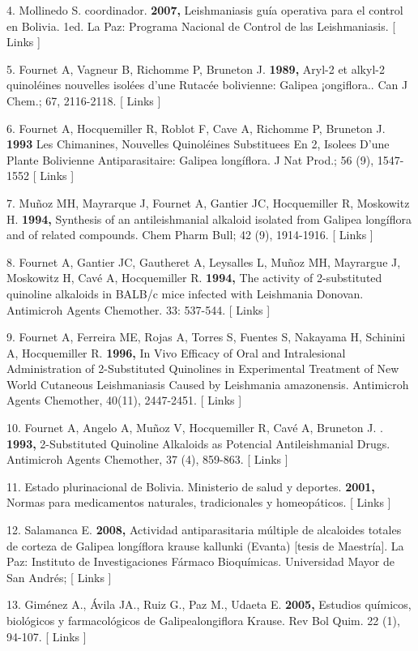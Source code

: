 \documentclass{article}
\begin{document}
4. Mollinedo S. coordinador. \textbf{2007, }
Leishmaniasis guía operativa para el control en Bolivia. 1ed. La Paz: Programa
Nacional de Control de las Leishmaniasis. [ Links ]

5. Fournet A, Vagneur B, Richomme P, Bruneton J. \textbf{1989, }
Aryl-2 et alkyl-2 quinoléines nouvelles isolées d'une Rutacée bolivienne:
Galipea ¡ongiflora.. Can J Chem.; 67, 2116-2118. [ Links ]

6. Fournet A, Hocquemiller R, Roblot F, Cave A, Richomme P, Bruneton J.
\textbf{1993 }
Les Chimanines, Nouvelles Quinoléines Substituees En 2, Isolees D'une Plante
Bolivienne Antiparasitaire: Galipea longíflora. J Nat Prod.; 56 (9), 1547-1552 [
Links ]

7. Muñoz MH, Mayrarque J, Fournet A, Gantier JC, Hocquemiller R, Moskowitz H.
\textbf{1994, }
Synthesis of an antileishmanial alkaloid isolated from Galipea longíflora and of
related compounds. Chem Pharm Bull; 42 (9), 1914-1916. [ Links ]

8. Fournet A, Gantier JC, Gautheret A, Leysalles L, Muñoz MH, Mayrargue J,
Moskowitz H, Cavé A, Hocquemiller R. \textbf{1994, }
The activity of 2-substituted quinoline alkaloids in BALB/c mice infected with
Leishmania Donovan. Antimicroh Agents Chemother. 33: 537-544. [ Links ]

9. Fournet A, Ferreira ME, Rojas A, Torres S, Fuentes S, Nakayama H, Schinini A,
Hocquemiller R. \textbf{1996, }
In Vivo Efficacy of Oral and Intralesional Administration of 2-Substituted
Quinolines in Experimental Treatment of New World Cutaneous Leishmaniasis Caused
by Leishmania amazonensis. Antimicroh Agents Chemother, 40(11), 2447-2451. [
Links ]

10. Fournet A, Angelo A, Muñoz V, Hocquemiller R, Cavé A, Bruneton J. .
\textbf{1993, }
2-Substituted Quinoline Alkaloids as Potencial Antileishmanial Drugs. Antimicroh
Agents Chemother, 37 (4), 859-863. [ Links ]

11. Estado plurinacional de Bolivia. Ministerio de salud y deportes.
\textbf{2001, }
Normas para medicamentos naturales, tradicionales y homeopáticos. [ Links ]

12. Salamanca E. \textbf{2008, }
Actividad antiparasitaria múltiple de alcaloides totales de corteza de Galipea
longíflora krause kallunki (Evanta) [tesis de Maestría]. La Paz: Instituto de
Investigaciones Fármaco Bioquímicas. Universidad Mayor de San Andrés; [ Links ]

13. Giménez A., Ávila JA., Ruiz G., Paz M., Udaeta E. \textbf{2005, }
Estudios químicos, biológicos y farmacológicos de Galipealongiflora Krause. Rev
Bol Quim. 22 (1), 94-107. [ Links ]
\end{document}
